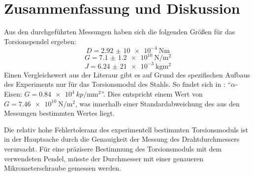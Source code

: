 \section{Zusammenfassung und Diskussion}
Aus den durchgeführten Messungen haben sich die folgenden Größen für das Torsionspendel ergeben:
\begin{equation*}
    D = \qty{2,92(10)e-4}{\newton\meter}
\end{equation*}
\begin{equation*}
    G = \qty{7.1(12)e10}{\newton\per\square\meter}
\end{equation*}
\begin{equation*}
    J = \qty{6,24(21)e-3}{\kilo\gram\meter\squared}
\end{equation*}
Einen Vergleichswert aus der Literaur gibt es auf Grund des spezifischen Aufbaus des Experiments nur für das Torsionsmodul des Stahls. So findet sich in \cite{Walcher2004}: "`$\alpha$-Eisen: $G = \qty{0,84e4}{kp\per\milli\meter\squared}$"'. Dies entspricht einem Wert von $G = \qty{7.46e10}{\newton\per\square\meter}$, was innerhalb einer Standardabweichung des aus den Messungen bestimmten Wertes liegt.

Die relativ hohe Fehlertoleranz des experimentell bestimmten Torsionsmoduls ist in der Hauptsache durch die Genauigkeit der Messung des Drahtdurchmessers verursacht.
Für eine präzisere Bestimmung des Torsionsmoduls mit dem verwendeten Pendel, müsste der Durchmesser mit einer genaueren Mikrometerschraube gemessen werden.
